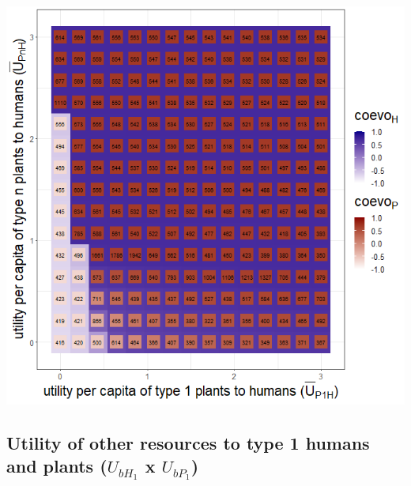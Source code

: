 \documentclass[
]{book}
\begin{document}
\includegraphics[width=1\linewidth]{plots/3_exp_utility_per_capita_type_plants_to_humans-tripleRaster_twoParameters}

\newpage

\hypertarget{utility-of-other-resources-to-type-1-humans-and-plants-u_bh_1-x-u_bp_1}{%
\subsection{\texorpdfstring{Utility of other resources to type 1 humans and plants (\(U_{bH_{1}}\) x \(U_{bP_{1}}\))}{Utility of other resources to type 1 humans and plants (U\_\{bH\_\{1\}\} x U\_\{bP\_\{1\}\})}}\label{utility-of-other-resources-to-type-1-humans-and-plants-u_bh_1-x-u_bp_1}}

\end{document}
